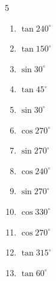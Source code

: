 \begin{multicols}{5}
\begin{enumerate}
  \item $\displaystyle \tan{240^\circ}$


  \item $\displaystyle \tan{150^\circ}$


  \item $\displaystyle \sin{30^\circ}$


\columnbreak %

\resetques

  \item $\displaystyle \tan{45^\circ}$

        \phantom{$\displaystyle =1$}

  \item $\displaystyle \sin{30^\circ}$


  \item $\displaystyle \cos{270^\circ}$

        \phantom{$\displaystyle =0$}

  \item $\displaystyle \sin{270^\circ}$

        \phantom{$\displaystyle =-1$}

  \item $\displaystyle \cos{240^\circ}$


  \item $\displaystyle \sin{270^\circ}$

        \phantom{$\displaystyle =-1$}

  \item $\displaystyle \cos{330^\circ}$


  \item $\displaystyle \cos{270^\circ}$

        \phantom{$\displaystyle =0$}

  \item $\displaystyle \tan{315^\circ}$

        \phantom{$\displaystyle =-1$}

  \item $\displaystyle \tan{60^\circ}$


\end{enumerate}
\end{multicols}
